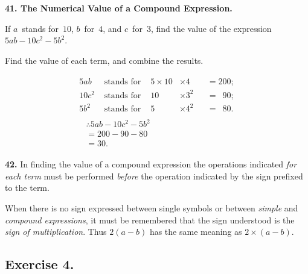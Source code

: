 \documentclass[12pt]{book}[2005/09/16]
\newcommand{\Require}[1][2\baselineskip]{%
  \setlength{\TmpLen}{\pagegoal-\pagetotal}%
  \ifthenelse{\lengthtest{0pt < \TmpLen}\and\lengthtest{\TmpLen < #1}}{%
    \vfil\newpage%
  }{}%
}
\newcommand{\Paragraph}[1]{\medskip\par\textbf{#1}}
\newcommand{\Exercise}[2][]{%
  \Require[3\baselineskip]
  \subsection*{\centering\small Exercise #2}
  \ifthenelse{\not\equal{#1}{}}{%
    \subsubsection*{\centering\normalfont\small\scshape #1}
  }{}
  \phantomsection\label{exer:#2}%
}
\newenvironment{Soln}[1][]{\par\small\textsc{#1}}{\par}
\newlength{\TmpLen}
\newcommand{\Z}{\phantom{0}}
\begin{document}
\Paragraph{41.  The Numerical Value of a Compound Expression.}

If $a$~stands for~$10$, $b$~for~$4$, and $c$~for~$3$, find the value of
the expression $5ab - 10c^{2} - 5b^{2}$.

Find the value of each term, and combine the results.
\begin{Soln}
\begin{gather*}
\begin{alignedat}{3}
    5ab &\text{ stands for } &5 × 10 &× 4    &&= 200; \\
10c^{2} &\text{ stands for } &    10 &× 3^{2} &&= \Z90; \\
5b^{2} &\text{ stands for }  &     5 &× 4^{2} &&= \Z80.
\end{alignedat} \\
\begin{aligned}
&\therefore 5ab - 10c^{2} - 5b^{2} \\
&= 200 - 90 - 80 \\
&=  30.
\end{aligned}
\end{gather*}
\end{Soln}

\Paragraph{42.}  In finding the value of a compound expression the
operations indicated \emph{for each term} must be performed \emph{before}
the operation indicated by the sign prefixed to the term.

When there is no sign expressed between single symbols
or between \emph{simple} and \emph{compound expressions}, it must be
remembered that the sign understood is the \emph{sign of multiplication}.
Thus $2(a - b)$ has the same meaning as $2 × (a - b)$.

\Exercise{4.}
\end{document}
